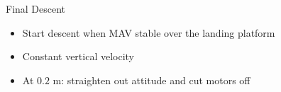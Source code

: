 
\begin{frame}{Final Descent}
		\begin{center}
		\end{center}
\begin{itemize}
	\item Start descent when MAV stable over the landing platform 
	\item Constant vertical velocity %
	\item At $0.2$ m: straighten out attitude and cut motors off
\end{itemize}
\end{frame}




